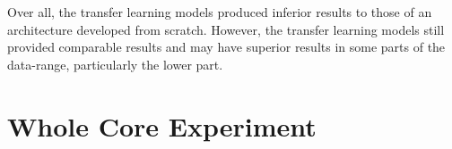 \noindent
Over all, the transfer learning models produced inferior results to those of an architecture developed from scratch. However, the transfer learning models still provided comparable results and may have superior results in some parts of the data-range, particularly the lower part.

\section{Whole Core Experiment}

